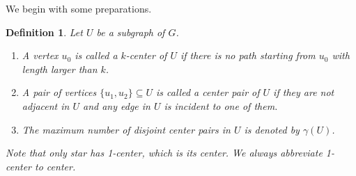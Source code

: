 \documentclass[a4paper]{article}
\newtheorem{defi}[thm]{Definition}
\newcommand{\emphd}[1]{{\fontseries{b}\selectfont\textsf{#1}}}
\begin{document}
We begin with some preparations. 
\begin{defi}
    Let $U$ be a subgraph of $G$.
    \begin{enumerate}
        \item A vertex $u_0$ is called a \emphd{$k$-center} of $U$ if there is no path starting from $u_0$ with length larger than $k$.
        \item A pair of vertices $\{u_1,u_2\}\subseteq U$ is called a \emphd{center pair} of $U$ if they are not adjacent in $U$ and any edge in $U$ is incident to one of them.
        \item The maximum number of \emphd{disjoint} center pairs in $U$ is denoted by $\gamma(U)$.
    \end{enumerate}   
     Note that only star has 1-center, which is its center. We always abbreviate 1-center to \emphd{center}. 
\end{defi}
\end{document}

